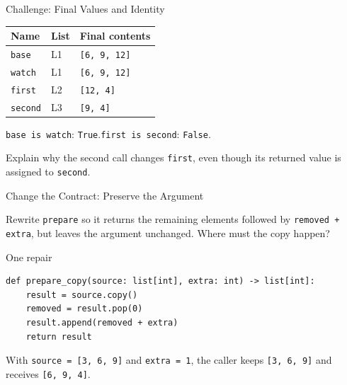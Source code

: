 \documentclass[aspectratio=169,10pt]{beamer}
\begin{document}
\begin{frame}{Challenge: Final Values and Identity}
  \begin{center}
    \renewcommand{\arraystretch}{1.45}
    \begin{tabular}{l|l|l}
      \textbf{Name} & \textbf{List} & \textbf{Final contents} \\\hline
      \texttt{base} & L1 & \texttt{[6, 9, 12]} \\
      \texttt{watch} & L1 & \texttt{[6, 9, 12]} \\
      \texttt{first} & L2 & \texttt{[12, 4]} \\
      \texttt{second} & L3 & \texttt{[9, 4]}
    \end{tabular}
  \end{center}
  \texttt{base is watch}: \texttt{True}.\qquad \texttt{first is second}: \texttt{False}.
  \begin{activity}
    Explain why the second call changes \texttt{first}, even though its returned value is assigned to \texttt{second}.
  \end{activity}
\end{frame}

\begin{frame}[fragile]{Change the Contract: Preserve the Argument}
  \begin{activity}
    Rewrite \texttt{prepare} so it returns the remaining elements followed by \texttt{removed + extra}, but leaves the argument unchanged. Where must the copy happen?
  \end{activity}
  \pause
  \begin{block}{One repair}
\begin{verbatim}
def prepare_copy(source: list[int], extra: int) -> list[int]:
    result = source.copy()
    removed = result.pop(0)
    result.append(removed + extra)
    return result
\end{verbatim}
  \end{block}
  With \texttt{source = [3, 6, 9]} and \texttt{extra = 1}, the caller keeps \texttt{[3, 6, 9]} and receives \texttt{[6, 9, 4]}.
\end{frame}

\end{document}
